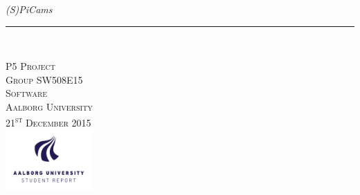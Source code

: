 \thispagestyle{empty}
\begin{flushright}
\vspace{3cm}

\phantom{hul}

\phantom{hul}

\phantom{hul}

\textsl{\Huge (S)PiCams} \\ \vspace{1cm}

\rule{13cm}{3mm} \\ %
\end{flushright}

\begin{center}
\end{center}
\begin{flushright}
\vspace{2cm}
\textsc{\Large P5 Project \\
Group SW508E15 \\
Software\\
Aalborg University\\
21\textsuperscript{st} December 2015\\
\includegraphics[width=0.25\textwidth]{graphics/AAU-logo-stud-UK-RGB.pdf}}
\end{flushright}